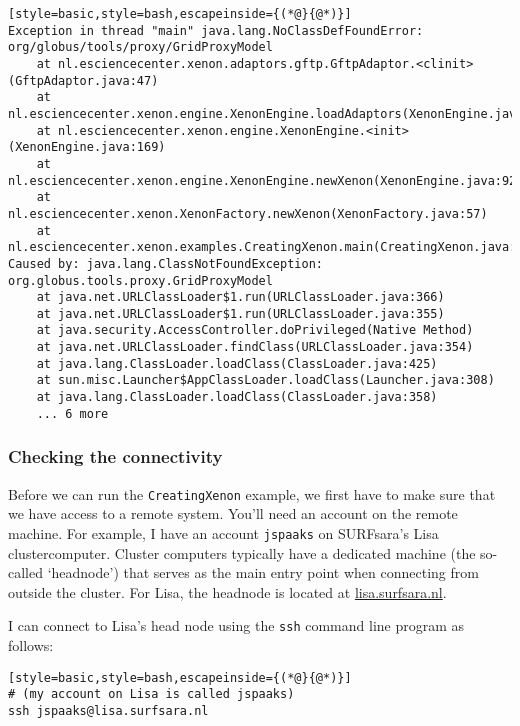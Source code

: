 {\begin{lstlisting}[style=basic,style=bash,escapeinside={(*@}{@*)}]
Exception in thread "main" java.lang.NoClassDefFoundError: org/globus/tools/proxy/GridProxyModel
    at nl.esciencecenter.xenon.adaptors.gftp.GftpAdaptor.<clinit>(GftpAdaptor.java:47)
    at nl.esciencecenter.xenon.engine.XenonEngine.loadAdaptors(XenonEngine.java:187)
    at nl.esciencecenter.xenon.engine.XenonEngine.<init>(XenonEngine.java:169)
    at nl.esciencecenter.xenon.engine.XenonEngine.newXenon(XenonEngine.java:92)
    at nl.esciencecenter.xenon.XenonFactory.newXenon(XenonFactory.java:57)
    at nl.esciencecenter.xenon.examples.CreatingXenon.main(CreatingXenon.java:39)
Caused by: java.lang.ClassNotFoundException: org.globus.tools.proxy.GridProxyModel
    at java.net.URLClassLoader$1.run(URLClassLoader.java:366)
    at java.net.URLClassLoader$1.run(URLClassLoader.java:355)
    at java.security.AccessController.doPrivileged(Native Method)
    at java.net.URLClassLoader.findClass(URLClassLoader.java:354)
    at java.lang.ClassLoader.loadClass(ClassLoader.java:425)
    at sun.misc.Launcher$AppClassLoader.loadClass(Launcher.java:308)
    at java.lang.ClassLoader.loadClass(ClassLoader.java:358)
    ... 6 more
\end{lstlisting} %










\subsubsection{Checking the connectivity}

Before we can run the \texttt{CreatingXenon} example, we first have to make sure that we have access to a remote system. You'll need an account on the remote machine. For example, I have an account \texttt{jspaaks} on SURFsara's Lisa clustercomputer. Cluster computers typically have a dedicated machine (the so-called `headnode') that serves as the main entry point when connecting from outside the cluster. For Lisa, the headnode is located at \url{lisa.surfsara.nl}.

I can connect to Lisa's head node using the \texttt{ssh} command line program as follows:
\begin{lstlisting}[style=basic,style=bash,escapeinside={(*@}{@*)}]
# (my account on Lisa is called jspaaks)
ssh jspaaks@lisa.surfsara.nl
\end{lstlisting}

}
